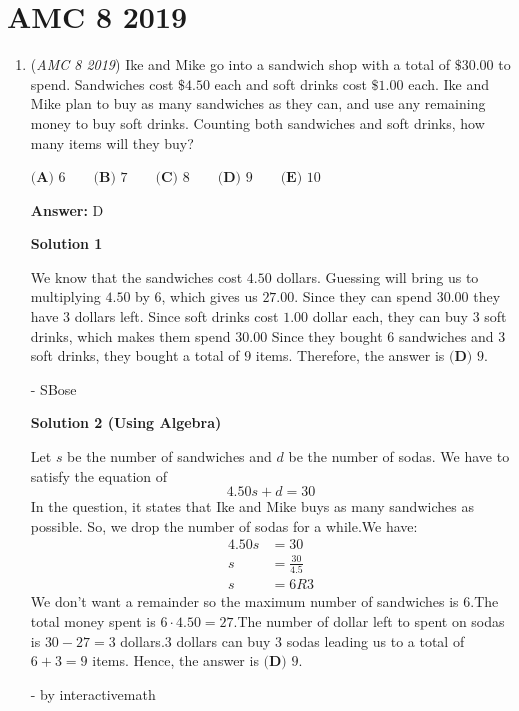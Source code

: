 \section{AMC 8 2019}
        \begin{enumerate}
        	\item (\textit{AMC 8 2019}) Ike and Mike go into a sandwich shop with a total of $\$30.00$ to spend. Sandwiches cost $\$4.50$ each and soft drinks cost $\$1.00$ each. Ike and Mike plan to buy as many sandwiches as they can, and use any remaining money to buy soft drinks. Counting both sandwiches and soft drinks, how many items will they buy?


 $\textbf{(A) }6\qquad\textbf{(B) }7\qquad\textbf{(C) }8\qquad\textbf{(D) }9\qquad\textbf{(E) }10$

 \textbf{Answer: }D



\textbf{Solution 1}

We know that the sandwiches cost $4.50$ dollars. Guessing will bring us to multiplying $4.50$ by 6, which gives us $27.00$. Since they can spend $30.00$ they have $3$ dollars left. Since soft drinks cost $1.00$ dollar each, they can buy 3 soft drinks, which makes them spend $30.00$  Since they bought 6 sandwiches and 3 soft drinks, they bought a total of $9$ items. Therefore, the answer is $\boxed{\textbf{(D) }9}$.

 - SBose

 



\textbf{Solution 2 (Using Algebra)}

Let $s$ be the number of sandwiches and $d$ be the number of sodas. We have to satisfy the equation of
 \[4.50s+d=30\]In the question, it states that Ike and Mike buys as many sandwiches as possible. So, we drop the number of sodas for a while.We have: 
 \begin{align*} 4.50s&=30 \\ s&=\frac{30}{4.5} \\ s&=6R3 \end{align*}
We don't want a remainder so the maximum number of sandwiches is $6$.The total money spent is $6\cdot 4.50=27$.The number of dollar left to spent on sodas is $30-27=3$ dollars.$3$ dollars can buy $3$ sodas leading us to a total of $6+3=9$ items. Hence, the answer is $\boxed{\textbf{(D) }9}$.

 - by interactivemath

 




\end{enumerate}
